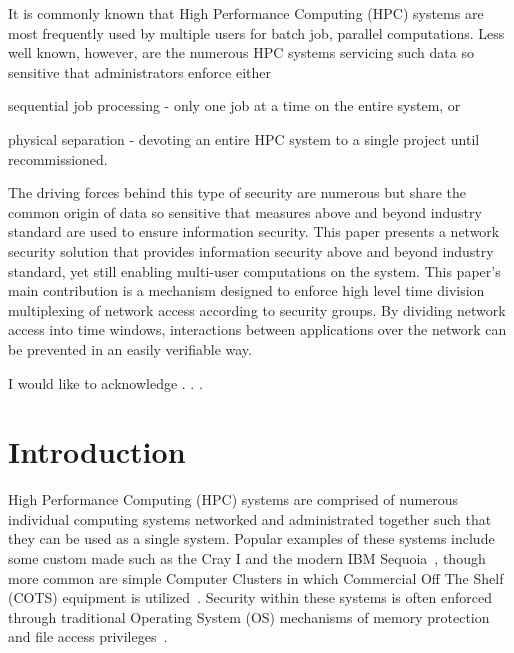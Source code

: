 \documentclass[oneside,12pt]{memoir}
\begin{document}
\pagestyle{plain}  %
\frontmatter
\thetitlepage

\setcounter{page}{1}
\asuabstract 
It is commonly known that High Performance Computing (HPC) systems are most frequently used by multiple users for batch job, parallel computations. Less well known, however, are the numerous HPC systems servicing such data so sensitive that administrators enforce either \begin{inparaenum} 
\item sequential job processing - only one job at a time on the entire system, or
\item physical separation - devoting an entire HPC system to a single project until recommissioned.
\end{inparaenum}
The driving forces behind this type of security are numerous but share the common origin of data so sensitive that measures above and beyond industry standard are used to ensure information security. This paper presents a network security solution that provides information security above and beyond industry standard, yet still enabling multi-user computations on the system. This paper's main contribution is a mechanism designed to enforce high level time division multiplexing of network access according to security groups. By dividing network access into time windows, interactions between applications over the network can be prevented in an easily verifiable way. 

\asuacknowledgements
{I would like to acknowledge . . .}

	\newpage
\vspace*{\fill}
\begingroup
\hspace*{\fill}
\hspace*{\fill}
\endgroup
\vspace*{\fill}

\tableofcontents

\listoffigures

\mainmatter
\pagestyle{asu} 

\chapter{Introduction}
High Performance Computing (HPC) systems are comprised of numerous individual computing systems networked and administrated together such that they can be used as a single system. Popular examples of these systems include some custom made such as the Cray I and the modern IBM Sequoia~\cite{leavitt2012big}, though more common are simple Computer Clusters in which Commercial Off The Shelf (COTS) equipment is utilized~\cite{buyya1999high}. Security within these systems is often enforced through traditional Operating System (OS) mechanisms of memory protection and file access privileges~\cite{buyya1999high}. 
\end{document}
